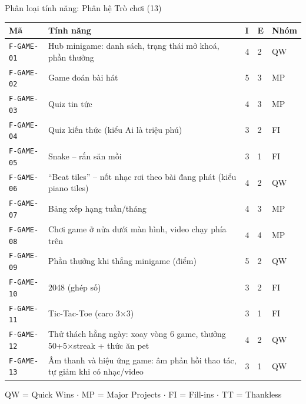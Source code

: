 \begin{frame}{Phân loại tính năng: Phân hệ Trò chơi (13)}
\begin{center}\tiny
\begin{tabular}{@{}p{1.5cm}p{7.5cm}p{0.3cm}p{0.3cm}p{0.8cm}@{}}
\toprule
\textbf{Mã} & \textbf{Tính năng} & \textbf{I} & \textbf{E} & \textbf{Nhóm} \\
\midrule
\texttt{F-GAME-01} & Hub minigame: danh sách, trạng thái mở khoá, phần thưởng & 4 & 2 & QW \\
\texttt{F-GAME-02} & Game đoán bài hát & 5 & 3 & MP \\
\texttt{F-GAME-03} & Quiz tin tức & 4 & 3 & MP \\
\texttt{F-GAME-04} & Quiz kiến thức (kiểu Ai là triệu phú) & 3 & 2 & FI \\
\texttt{F-GAME-05} & Snake -- rắn săn mồi & 3 & 1 & FI \\
\texttt{F-GAME-06} & ``Beat tiles'' -- nốt nhạc rơi theo bài đang phát (kiểu piano tiles) & 4 & 2 & QW \\
\texttt{F-GAME-07} & Bảng xếp hạng tuần/tháng & 4 & 3 & MP \\
\texttt{F-GAME-08} & Chơi game ở nửa dưới màn hình, video chạy phía trên & 4 & 4 & MP \\
\texttt{F-GAME-09} & Phần thưởng khi thắng minigame (điểm) & 5 & 2 & QW \\
\texttt{F-GAME-10} & 2048 (ghép số) & 3 & 2 & FI \\
\texttt{F-GAME-11} & Tic-Tac-Toe (caro 3$\times$3) & 3 & 1 & FI \\
\texttt{F-GAME-12} & Thử thách hằng ngày: xoay vòng 6 game, thưởng 50+5$\times$streak + thức ăn pet & 4 & 2 & QW \\
\texttt{F-GAME-13} & Âm thanh và hiệu ứng game: âm phản hồi thao tác, tự giảm khi có nhạc/video & 3 & 1 & QW \\
\bottomrule
\end{tabular}
\end{center}
\vfill
{\tiny\color{TextGray} QW = Quick Wins $\cdot$ MP = Major Projects $\cdot$ FI = Fill-ins $\cdot$ TT = Thankless}
\end{frame}

